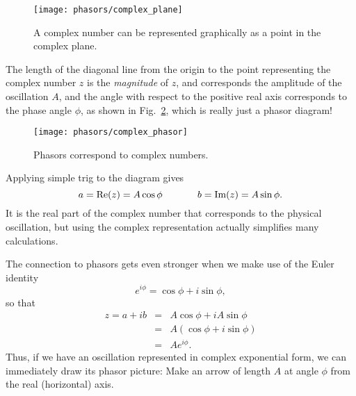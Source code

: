 \begin{figure}\begin{center}
\texttt{[image: phasors/complex\_plane]}  
\caption{\label{fig:complexPlane} A complex number can be represented
graphically as a point in the complex plane.}
\end{center}
\end{figure}

The length of the diagonal line from the origin to the point representing
the complex number $z$ is the \textit{magnitude} of $z$, and corresponds
the amplitude of the oscillation $A$, and the angle with respect to the 
positive real axis corresponds to the phase angle $\phi$, as shown in 
Fig.~\ref{fig:complexPhasor}, which is really just a phasor diagram!
\begin{figure}[b]
\begin{center}
\texttt{[image: phasors/complex\_phasor]}  
\caption{\label{fig:complexPhasor}Phasors correspond to complex numbers.}
\end{center}
\end{figure}

Applying simple trig to the diagram gives 
\begin{equation}
a = \mbox{Re}(z) = A \cos\phi\hspace{0.5in}b = \mbox{Im}(z) = A\sin\phi.
\end{equation} 
It is the real part of the complex number that corresponds to the 
physical oscillation,  but using the complex representation actually 
simplifies many calculations.  

The connection to phasors gets even stronger when we make use of the 
Euler identity
\begin{equation}
e^{i\phi} = \cos\phi + i\sin\phi,
\label{eq:euler}
\end{equation}
so that
\begin{eqnarray}
z = a + ib &=& A\cos\phi + i A\sin\phi \nonumber \\
	   &=& A(\cos\phi + i\sin\phi)  \nonumber \\
  	   &=& Ae^{i\phi}.
\end{eqnarray}
Thus, if we have an oscillation represented in complex exponential form,
we can immediately draw its phasor picture:  Make an arrow of length
$A$ at angle $\phi$ from the real (horizontal) axis.

